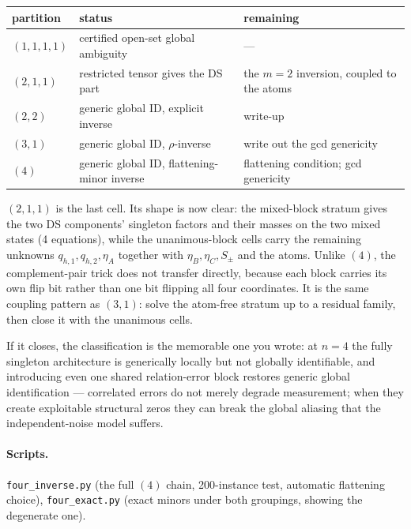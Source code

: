 \documentclass[11pt]{article}
\theoremstyle{remark}
\begin{document}
\begin{center}\small
\begin{tabular}{@{}lll@{}}
\toprule
partition & status & remaining\\
\midrule
$(1,1,1,1)$ & certified open-set global ambiguity & ---\\
$(2,1,1)$ & restricted tensor gives the DS part & the $m=2$ inversion, coupled to the atoms\\
$(2,2)$ & generic global ID, explicit inverse & write-up\\
$(3,1)$ & generic global ID, $\rho$-inverse & write out the gcd genericity\\
$(4)$ & generic global ID, flattening-minor inverse & flattening condition; gcd genericity\\
\bottomrule
\end{tabular}
\end{center}

$(2,1,1)$ is the last cell. Its shape is now clear: the mixed-block stratum gives the two DS components' singleton factors and their masses on the two mixed states (4 equations), while the unanimous-block cells carry the remaining unknowns $q_{h,1},q_{h,2},\eta_A$ together with $\eta_B,\eta_C,S_\pm$ and the atoms. Unlike $(4)$, the complement-pair trick does not transfer directly, because each block carries its own flip bit rather than one bit flipping all four coordinates. It is the same coupling pattern as $(3,1)$: solve the atom-free stratum up to a residual family, then close it with the unanimous cells.

If it closes, the classification is the memorable one you wrote: at $n=4$ the fully singleton architecture is generically locally but not globally identifiable, and introducing even one shared relation-error block restores generic global identification --- correlated errors do not merely degrade measurement; when they create exploitable structural zeros they can break the global aliasing that the independent-noise model suffers.

\paragraph{Scripts.} \texttt{four\_inverse.py} (the full $(4)$ chain, 200-instance test, automatic flattening choice), \texttt{four\_exact.py} (exact minors under both groupings, showing the degenerate one).
\end{document}
